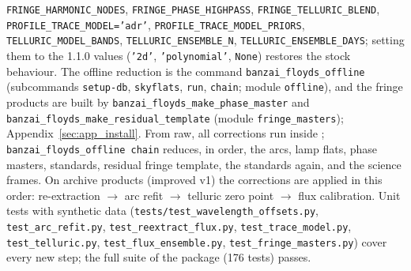 \texttt{FRINGE\_HARMONIC\_NODES}, \texttt{FRINGE\_PHASE\_HIGHPASS}, \texttt{FRINGE\_TELLURIC\_BLEND},
\texttt{PROFILE\_TRACE\_MODEL='adr'}, \texttt{PROFILE\_TRACE\_MODEL\_PRIORS}, \texttt{TELLURIC\_MODEL\_BANDS},
\texttt{TELLURIC\_ENSEMBLE\_N}, \texttt{TELLURIC\_ENSEMBLE\_DAYS}; setting them to the 1.1.0 values
(\texttt{'2d'}, \texttt{'polynomial'}, \texttt{None}) restores the stock behaviour. The offline reduction is the
command \texttt{banzai\_floyds\_offline} (subcommands \texttt{setup-db}, \texttt{skyflats}, \texttt{run},
\texttt{chain}; module \texttt{offline}), and the fringe products are built by \texttt{banzai\_floyds\_make\_phase\_master} and
\texttt{banzai\_floyds\_make\_residual\_template} (module \texttt{fringe\_masters}); Appendix~\ref{sec:app_install}.
From raw, all corrections run inside \banzai{}; \texttt{banzai\_floyds\_offline chain} reduces, in order, the arcs,
lamp flats, phase masters, standards, residual fringe template, the standards again, and the science frames. On
archive products (improved v1) the corrections are applied in this order: re-extraction $\rightarrow$ arc refit $\rightarrow$ telluric zero point $\rightarrow$ flux calibration. Unit tests with synthetic data (\texttt{tests/test\_wavelength\_offsets.py},
\texttt{test\_arc\_refit.py}, \texttt{test\_reextract\_flux.py}, \texttt{test\_trace\_model.py},
\texttt{test\_telluric.py}, \texttt{test\_flux\_ensemble.py}, \texttt{test\_fringe\_masters.py}) cover every new
step; the full suite of the package (176 tests) passes.
